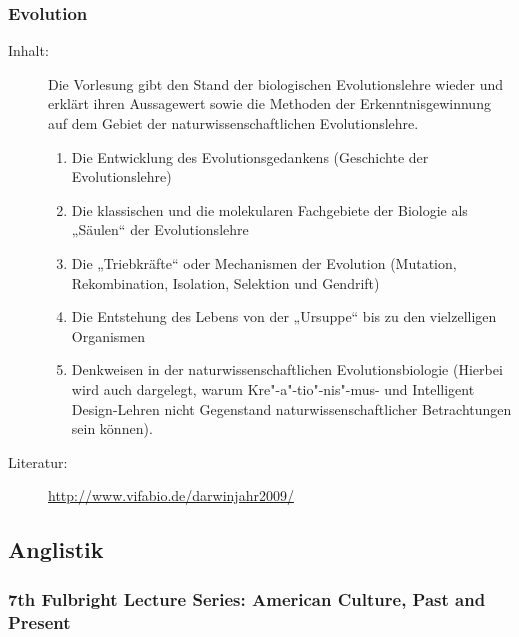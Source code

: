\documentclass[%
a4paper, %
11pt,               %
leqno,              %
fleqn,              %
]
{scrartcl}
\begin{document}

\subsubsection{Evolution} %
\label{ssub:Evolution}

\begin{description}
  \item[Inhalt:] Die Vorlesung gibt den Stand der biologischen Evolutionslehre
    wieder und erklärt ihren Aussagewert sowie die Methoden der
    Erkenntnisgewinnung auf dem Gebiet der naturwissenschaftlichen
    Evolutionslehre.
  \begin{enumerate}\itemsep0pt
    \item Die Entwicklung des Evolutionsgedankens (Geschichte der Evolutionslehre)
    \item Die klassischen und die molekularen Fachgebiete der Biologie als
      „Säulen“ der Evolutionslehre
    \item Die „Triebkräfte“ oder Mechanismen der Evolution (Mutation,
      Rekombination, Isolation, Selektion und Gendrift)
    \item Die Entstehung des Lebens von der „Ursuppe“ bis zu den vielzelligen
      Organismen
    \item Denkweisen in der naturwissenschaftlichen Evolutionsbiologie (Hierbei
      wird auch dargelegt, warum Kre"-a"-tio"-nis"-mus- und Intelligent Design-Lehren
      nicht Gegenstand naturwissenschaftlicher Betrachtungen sein können).
  \end{enumerate}
  \item[Literatur:] \url{http://www.vifabio.de/darwinjahr2009/}
\end{description}



\subsection{Anglistik} %
\label{sub:Anglistik}

\subsubsection{7th Fulbright Lecture Series: American Culture, Past and Present}
\label{ssub:7th Fulbright Lecture Series: American Culture, Past and Present}
\end{document}
